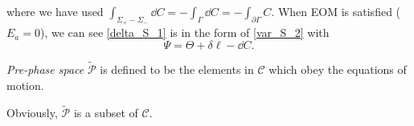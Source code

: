 \documentclass[10pt]{article}
\begin{document}
where we have used $\int_{\Sigma_+ -\Sigma_-}\dd{C}=-\int_\Gamma \dd{C}=-\int_{\partial\Gamma}C$. 
When EOM is satisfied ($E_a=0$), we can see \cref{delta_S_1} is in the form of \cref{var_S_2} with
\begin{equation}
    \Psi=\Theta+\delta\ell-\dd{C}.
\end{equation}

\begin{definition}
    \textit{Pre-phase space} $\widetilde{\mathcal{P}}$ is defined to be the elements in $\mathcal{C}$ which obey the equations of motion.
\end{definition}
Obviously, $\widetilde{\mathcal{P}}$ is a subset of $\mathcal{C}$.
\end{document}
